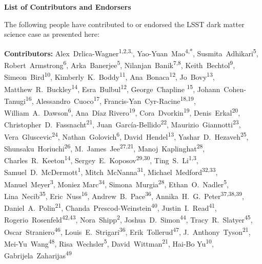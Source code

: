 
\begin{center}
  {\Large \bf List of Contributors and Endorsers}
\end{center}
\bigskip

The following people have contributed to or endorsed the LSST dark matter science case as presented here:

\def\altaffilmark#1{\textsuperscript{#1}}
\def\affil#1{\noindent #1 \\}

\normalsize
\begin{raggedright}
\textbf{Contributors:}
Alex~Drlica-Wagner\altaffilmark{1,2,3,\textdagger},
Yao-Yuan~Mao\altaffilmark{4,*},
Susmita~Adhikari\altaffilmark{5},
Robert~Armstrong\altaffilmark{6},
Arka~Banerjee\altaffilmark{5},
Nilanjan~Banik\altaffilmark{7,8},
Keith~Bechtol\altaffilmark{9},
Simeon~Bird\altaffilmark{10},
Kimberly~K.~Boddy\altaffilmark{11},
Ana~Bonaca\altaffilmark{12},
Jo~Bovy\altaffilmark{13},
Matthew~R.~Buckley\altaffilmark{14},
Esra~Bulbul\altaffilmark{12},
George~Chapline \altaffilmark{15},
Johann~Cohen-Tanugi\altaffilmark{16},
Alessandro~Cuoco\altaffilmark{17},
Francis-Yan~Cyr-Racine\altaffilmark{18,19},
William~A.~Dawson\altaffilmark{6},
Ana~D\'{i}az Rivero\altaffilmark{19},
Cora~Dvorkin\altaffilmark{19},
Denis~Erkal\altaffilmark{20},
Christopher~D.~Fassnacht\altaffilmark{21},
Juan~Garc\'ia-Bellido\altaffilmark{22},
Maurizio~Giannotti\altaffilmark{23},
Vera~Gluscevic\altaffilmark{24},
Nathan~Golovich\altaffilmark{6},
David~Hendel\altaffilmark{13},
Yashar~D.~Hezaveh\altaffilmark{25},
Shunsaku~Horiuchi\altaffilmark{26},
M.~James~Jee\altaffilmark{27,21},
Manoj~Kaplinghat\altaffilmark{28},
Charles~R.~Keeton\altaffilmark{14},
Sergey~E.~Koposov\altaffilmark{29,30},
Ting~S.~Li\altaffilmark{1,3},
Samuel~D.~McDermott\altaffilmark{1},
Mitch~McNanna\altaffilmark{31},
Michael~Medford\altaffilmark{32,33},
Manuel~Meyer\altaffilmark{3},
Moniez Marc\altaffilmark{34},
Simona~Murgia\altaffilmark{28},
Ethan~O.~Nadler\altaffilmark{5},
Lina~Necib\altaffilmark{35},
Eric~Nuss\altaffilmark{16},
Andrew~B.~Pace\altaffilmark{36},
Annika~H.~G.~Peter\altaffilmark{37,38,39},
Daniel~A.~Polin\altaffilmark{21},
Chanda~Prescod-Weinstein\altaffilmark{40},
Justin~I.~Read\altaffilmark{41},
Rogerio~Rosenfeld\altaffilmark{42,43},
Nora~Shipp\altaffilmark{2},
Joshua~D.~Simon\altaffilmark{44},
Tracy~R.~Slatyer\altaffilmark{45},
Oscar~Straniero\altaffilmark{46},
Louis~E.~Strigari\altaffilmark{36},
Erik~Tollerud\altaffilmark{47},
J.~Anthony~Tyson\altaffilmark{21},
Mei-Yu~Wang\altaffilmark{48},
Risa~Wechsler\altaffilmark{5},
David~Wittman\altaffilmark{21},
Hai-Bo Yu\altaffilmark{10},
Gabrijela~Zaharijas\altaffilmark{49}


\end{raggedright}
